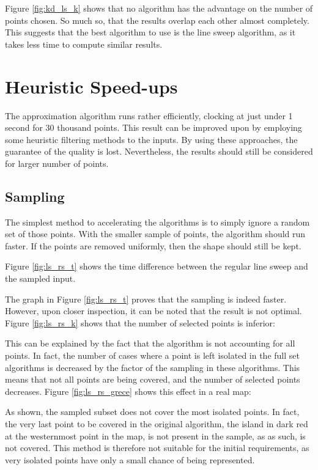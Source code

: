 

Figure \ref{fig:kd_ls_k} shows that no algorithm has the advantage on the number of points chosen. So much so, that the results overlap each other almost completely. This suggests that the best algorithm to use is the line sweep algorithm, as it takes less time to compute similar results.

\section{Heuristic Speed-ups}
The approximation algorithm runs rather efficiently, clocking at just under 1 second for 30 thousand points. This result can be improved upon by employing some heuristic filtering methods to the inputs. By using these approaches, the guarantee of the quality is lost. Nevertheless, the results should still be considered for larger number of points.
\subsection{Sampling}
The simplest method to accelerating the algorithms is to simply ignore a random set of those points. With the smaller sample of points, the algorithm should run faster. If the points are removed uniformly, then the shape should still be kept.

Figure \ref{fig:ls_rs_t} shows the time difference between the regular line sweep and the sampled input.



The graph in Figure \ref{fig:ls_rs_t} proves that the sampling is indeed faster. However, upon closer inspection, it can be noted that the result is not optimal. Figure \ref{fig:ls_rs_k} shows that the number of selected points is inferior:



This can be explained by the fact that the algorithm is not accounting for all points. In fact, the number of cases where a point is left isolated in the full set algorithms is decreased by the factor of the sampling in these algorithms. This means that not all points are being covered, and the number of selected points decreases. Figure \ref{fig:ls_rs_grece} shows this effect in a real map:



As shown, the sampled subset does not cover the most isolated points. In fact, the very last point to be covered in the original algorithm, the island in dark red at the westernmost point in the map, is not present in the sample, as as such, is not covered. This method is therefore not suitable for the initial requirements, as very isolated points have only a small chance of being represented.

